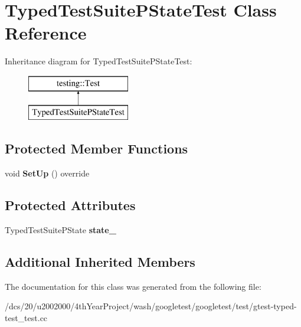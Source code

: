 \hypertarget{classTypedTestSuitePStateTest}{}\section{Typed\+Test\+Suite\+P\+State\+Test Class Reference}
\label{classTypedTestSuitePStateTest}
Inheritance diagram for Typed\+Test\+Suite\+P\+State\+Test\+:\begin{figure}[H]
\begin{center}
\leavevmode
\includegraphics[height=2.000000cm]{classTypedTestSuitePStateTest}
\end{center}
\end{figure}
\subsection*{Protected Member Functions}
\begin{DoxyCompactItemize}
\item 
\mbox{\label{classTypedTestSuitePStateTest_a15417c392ef67e01accf9096734279e8}} 
void {\bfseries Set\+Up} () override
\end{DoxyCompactItemize}
\subsection*{Protected Attributes}
\begin{DoxyCompactItemize}
\item 
\mbox{\label{classTypedTestSuitePStateTest_abab73d1a017a51a9b715ae5d2ab7626d}} 
Typed\+Test\+Suite\+P\+State {\bfseries state\+\_\+}
\end{DoxyCompactItemize}
\subsection*{Additional Inherited Members}


The documentation for this class was generated from the following file\+:\begin{DoxyCompactItemize}
\item 
/dcs/20/u2002000/4th\+Year\+Project/wash/googletest/googletest/test/gtest-\/typed-\/test\+\_\+test.\+cc\end{DoxyCompactItemize}
